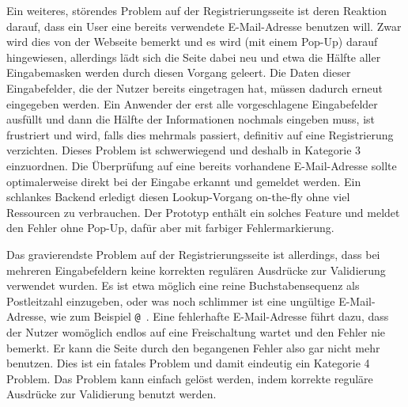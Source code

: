 \label{prob:reg:popup}
{ Ein weiteres, störendes Problem auf der Registrierungsseite ist deren Reaktion darauf, dass ein User eine bereits verwendete E-Mail-Adresse benutzen will. Zwar wird dies von der Webseite bemerkt und es wird (mit einem Pop-Up) darauf hingewiesen, allerdings lädt sich die Seite dabei neu und etwa die Hälfte aller Eingabemasken werden durch diesen Vorgang geleert. Die Daten dieser Eingabefelder, die der Nutzer bereits eingetragen hat, müssen dadurch erneut eingegeben werden.
}
{ Ein Anwender der erst alle vorgeschlagene Eingabefelder ausfüllt und dann die Hälfte der Informationen nochmals eingeben muss, ist frustriert und wird, falls dies mehrmals passiert, definitiv auf eine Registrierung verzichten. Dieses Problem ist schwerwiegend und deshalb in Kategorie 3 einzuordnen.
}
{ Die Überprüfung auf eine bereits vorhandene E-Mail-Adresse sollte optimalerweise direkt bei der Eingabe erkannt und gemeldet werden. Ein schlankes Backend erledigt diesen Lookup-Vorgang on-the-fly ohne viel Ressourcen zu verbrauchen. Der Prototyp enthält ein solches Feature und meldet den Fehler ohne Pop-Up, dafür aber mit farbiger Fehlermarkierung.
}  
\label{prob:reg:vergivenmail}


{ Das gravierendste Problem auf der Registrierungsseite ist allerdings, dass bei mehreren Eingabefeldern keine korrekten regulären Ausdrücke zur Validierung verwendet wurden. Es ist etwa möglich eine reine Buchstabensequenz als Postleitzahl einzugeben, oder was noch schlimmer ist eine ungültige E-Mail-Adresse, wie zum Beispiel \glqq \texttt{@}\grqq ~.
}
{ Eine fehlerhafte E-Mail-Adresse führt dazu, dass der Nutzer womöglich endlos auf eine Freischaltung wartet und den Fehler nie bemerkt. Er kann die Seite durch den begangenen Fehler also gar nicht mehr benutzen. Dies ist ein fatales Problem und damit eindeutig ein Kategorie 4 Problem.}
{ Das Problem kann einfach gelöst werden, indem korrekte reguläre Ausdrücke zur Validierung benutzt werden.
} 
\label{prob:reg:regex}

